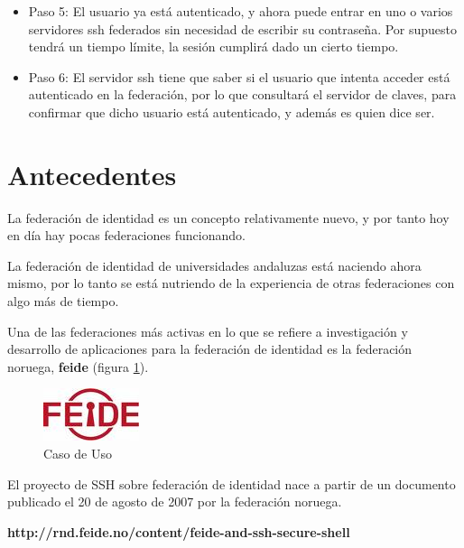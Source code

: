 \begin{itemize}
        \item{Paso 5:} El usuario ya está autenticado, y ahora puede
        entrar en uno o varios servidores ssh federados sin necesidad de
        escribir su contraseña. Por supuesto tendrá un tiempo límite,
        la sesión cumplirá dado un cierto tiempo.

        \item{Paso 6:} El servidor ssh tiene que saber si el usuario
        que intenta acceder está autenticado en la federación, por lo
        que consultará el servidor de claves, para confirmar que dicho
        usuario está autenticado, y además es quien dice ser.

    \end{itemize}


\newpage
\section{Antecedentes}

    La federación de identidad es un concepto relativamente nuevo, y
    por tanto hoy en día hay pocas federaciones funcionando.

    La federación de identidad de universidades andaluzas está
    naciendo ahora mismo, por lo tanto se está nutriendo de la
    experiencia de otras federaciones con algo más de tiempo.

    Una de las federaciones más activas en lo que se refiere a
    investigación y desarrollo de aplicaciones para la federación de
    identidad es la federación noruega, \textbf{feide} (figura
    \ref{fig:feide}).

    \begin{figure}[htp]
        \centering
            \includegraphics{img/feide.jpg}
            \caption{Caso de Uso}
        \label{fig:feide}
    \end{figure}

    El proyecto de SSH sobre federación de identidad nace a partir de
    un documento publicado el 20 de agosto de 2007 por la federación
    noruega.

    \textbf{http://rnd.feide.no/content/feide-and-ssh-secure-shell}

